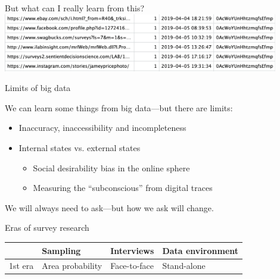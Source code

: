 \documentclass[aspectratio=169]{beamer}
\begin{document}
\begin{frame}

\begin{center}
\LARGE{But what can I really learn from this?}
\vfill
\includegraphics[width=0.9\textwidth]{figures/trace-data.png}
\end{center}

\end{frame}
\begin{frame}{Limits of big data}

We can learn some things from big data---but there are limits:
\begin{itemize}
\item Inaccuracy, inaccessibility and incompleteness
\pause
\item Internal states vs. external states
\pause
\begin{itemize}
\item Social desirability bias in the online sphere 
\pause
\item Measuring the ``subconscious'' from digital traces
\end{itemize}
\end{itemize}


\vfill

\end{frame}
\begin{frame}

\begin{center}
\LARGE{We will always need to ask---but how we ask will change.}
\end{center}

\end{frame}
\begin{frame}{Eras of survey research}

\begin{center}
\renewcommand{\arraystretch}{1.5}
\begin{tabular}{p{}p{}p{}p{}}
& \textbf{Sampling} & \textbf{Interviews} & \textbf{Data environment}\\
\hline
\hline
1st era & Area probability & Face-to-face & Stand-alone \\
\end{tabular}
\end{center}

\end{frame}
\end{document}
